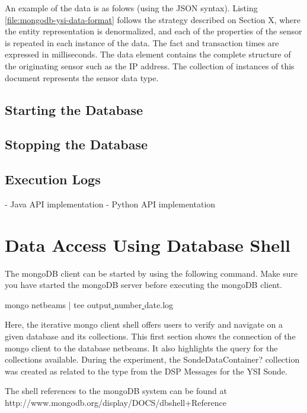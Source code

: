 An example of the data is as folows (using the JSON syntax). Listing
\ref{file:mongodb-ysi-data-format} follows the strategy described on Section X,
where the entity representation is denormalized, and each of the properties of
the sensor is repeated in each instance of the data. The fact and transaction
times are expressed in milliseconds. The data element contains the complete
structure of the originating sensor such as the IP address. The collection of
instances of this document represents the sensor data type.

\subsection{Starting the Database}

\subsection{Stopping the Database}

\subsection{Execution Logs}

- Java API implementation
- Python API implementation

\section{Data Access Using Database Shell}

The mongoDB client can be started by using the following command. Make sure you
have started the mongoDB server before executing the mongoDB client.


mongo netbeams | tee output\underline{ }number\underline{ }date.log


Here, the iterative mongo client shell offers users to verify and navigate on a
given database and its collections. This first section shows the connection of
the mongo client to the database netbeams. It also highlights the query for the
collections available. During the experiment, the SondeDataContainer?
collection was created as related to the type from the DSP Messages for the YSI
Sonde.

The shell references to the mongoDB system can be found at
http://www.mongodb.org/display/DOCS/dbshell+Reference 

